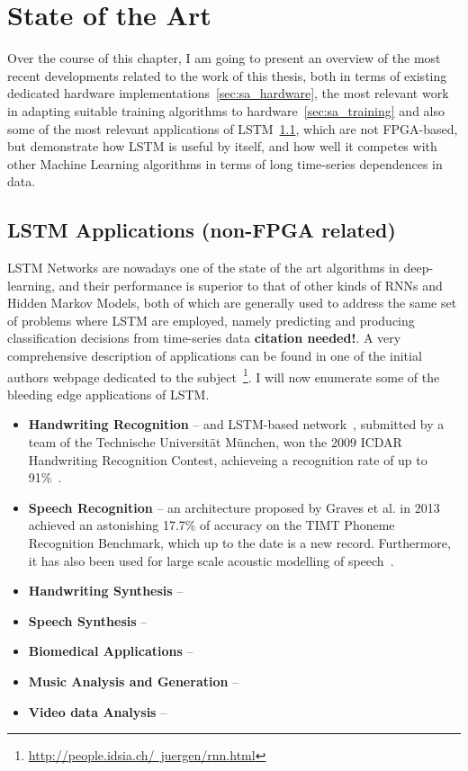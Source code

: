 \chapter{State of the Art}\label{chap:stateArt}

Over the course of this chapter, I am going to present an overview of the most recent developments related to the work of this thesis, both in terms of existing dedicated hardware implementations~\ref{sec:sa_hardware}, the most relevant work in adapting suitable training algorithms to hardware~\ref{sec:sa_training} and also some of the most relevant applications of LSTM~\ref{sec:sa_apps}, which are not FPGA-based, but demonstrate how LSTM is useful by itself, and how well it competes with other Machine Learning algorithms in terms of long time-series dependences in data.

\section{LSTM Applications (non-FPGA related)}\label{sec:sa_apps} 
LSTM Networks are nowadays one of the state of the art algorithms in deep-learning, and their performance is superior to that of other kinds of RNNs and Hidden Markov Models, both of which are generally used to address the same set of problems where LSTM are employed, namely predicting and producing classification decisions from time-series data \textbf{citation needed!}. A very comprehensive description of applications can be found in one of the initial authors webpage dedicated to the subject~\footnote{\href{http://people.idsia.ch/~juergen/rnn.html}{http://people.idsia.ch/~juergen/rnn.html}}. I will now enumerate some of the bleeding edge applications of LSTM.

\begin{itemize}
    \item \textbf{Handwriting Recognition} -- and LSTM-based network~\cite{Bertolami09}, submitted by a team of the Technische Universität München, won the 2009 ICDAR Handwriting Recognition Contest, achieveing a recognition rate of up to 91\%~\cite{ICDAR09}.
    \item \textbf{Speech Recognition} -- an architecture\cite{Graves13} proposed by Graves et al. in 2013 achieved an astonishing 17.7\% of accuracy on the TIMT Phoneme Recognition Benchmark, which up to the date is a new record. Furthermore, it has also been used for large scale acoustic modelling of speech~\cite{Sak14}.
    \item \textbf{Handwriting Synthesis} --
    \item \textbf{Speech Synthesis} --
    \item \textbf{Biomedical Applications} --
    \item \textbf{Music Analysis and Generation} --
    \item \textbf{Video data Analysis} --


\end{itemize}




